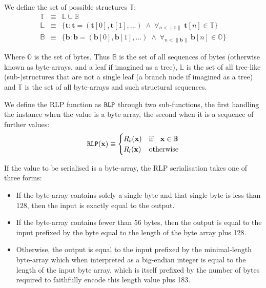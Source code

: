 \documentclass[9pt,oneside]{amsart}
\begin{document}
We define the set of possible structures $\mathbb{T}$:
\begin{eqnarray}
\mathbb{T} & \equiv & \mathbb{L} \cup \mathbb{B} \\
\mathbb{L} & \equiv & \{ \mathbf{t}: \mathbf{t} = ( \mathbf{t}[0], \mathbf{t}[1], ... ) \; \wedge \; \forall_{n < \lVert \mathbf{t} \rVert} \; \mathbf{t}[n] \in \mathbb{T} \} \\
\mathbb{B} & \equiv & \{ \mathbf{b}: \mathbf{b} = ( \mathbf{b}[0], \mathbf{b}[1], ... ) \; \wedge \; \forall_{n < \lVert \mathbf{b} \rVert} \; \mathbf{b}[n] \in \mathbb{O} \}
\end{eqnarray}

Where $\mathbb{O}$ is the set of bytes. Thus $\mathbb{B}$ is the set of all sequences of bytes (otherwise known as byte-arrays, and a leaf if imagined as a tree), $\mathbb{L}$ is the set of all tree-like (sub-)structures that are not a single leaf (a branch node if imagined as a tree) and $\mathbb{T}$ is the set of all byte-arrays and such structural sequences.

We define the RLP function as $\mathtt{\tiny RLP}$ through two sub-functions, the first handling the instance when the value is a byte array, the second when it is a sequence of further values:
\begin{equation}
\mathtt{\tiny RLP}(\mathbf{x}) \equiv \begin{cases} R_b(\mathbf{x}) & \text{if} \quad \mathbf{x} \in \mathbb{B} \\ R_l(\mathbf{x}) & \text{otherwise} \end{cases}
\end{equation}

If the value to be serialised is a byte-array, the RLP serialisation takes one of three forms:

\begin{itemize}
\item If the byte-array contains solely a single byte and that single byte is less than 128, then the input is exactly equal to the output.
\item If the byte-array contains fewer than 56 bytes, then the output is equal to the input prefixed by the byte equal to the length of the byte array plus 128.
\item Otherwise, the output is equal to the input prefixed by the minimal-length byte-array which when interpreted as a big-endian integer is equal to the length of the input byte array, which is itself prefixed by the number of bytes required to faithfully encode this length value plus 183.
\end{itemize}
\end{document}
